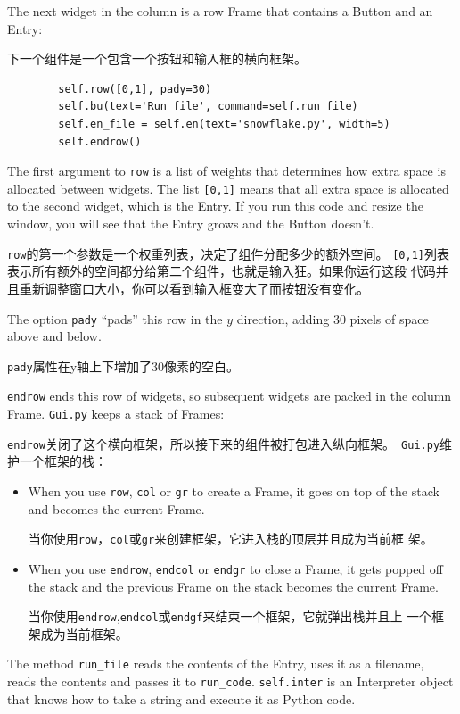 \documentclass[10pt]{book}
\begin{document}
\begin{CJK}{UTF8}{gbsn}
The next widget in the column is a row Frame that contains
a Button and an Entry:

下一个组件是一个包含一个按钮和输入框的横向框架。

\begin{verbatim}
        self.row([0,1], pady=30)
        self.bu(text='Run file', command=self.run_file)
        self.en_file = self.en(text='snowflake.py', width=5)
        self.endrow()
\end{verbatim}
%
The first argument to {\tt row} is a list of weights that
determines how extra space is allocated between widgets.  
The list {\tt [0,1]} means that all extra space is allocated
to the second widget, which is the Entry.  If you run this code
and resize the window, you will see that the Entry grows and
the Button doesn't.

{\tt row}的第一个参数是一个权重列表，决定了组件分配多少的额外空间。
{\tt [0,1]}列表表示所有额外的空间都分给第二个组件，也就是输入狂。如果你运行这段
代码并且重新调整窗口大小，你可以看到输入框变大了而按钮没有变化。

The option {\tt pady} ``pads'' this row in the $y$ direction,
adding 30 pixels of space above and below.

{\tt pady}属性在y轴上下增加了30像素的空白。

{\tt endrow} ends this row of widgets, so subsequent widgets are
packed in the column Frame.  {\tt Gui.py} keeps a stack of Frames:

{\tt endrow}关闭了这个横向框架，所以接下来的组件被打包进入纵向框架。{\tt
Gui.py}维护一个框架的栈：

\begin{itemize}

\item When you use {\tt row}, {\tt col} or {\tt gr} to create a Frame,
it goes on top of the stack and becomes the current Frame.

当你使用{\tt row}，{\tt col}或{\tt gr}来创建框架，它进入栈的顶层并且成为当前框
架。

\item When you use {\tt endrow}, {\tt endcol} or {\tt endgr} to close
a Frame, it gets popped off the stack and the previous Frame on the
stack becomes the current Frame.

当你使用{\tt endrow},{\tt endcol}或{\tt endgf}来结束一个框架，它就弹出栈并且上
一个框架成为当前框架。

\end{itemize} 

The method \verb"run_file" reads the contents of the Entry,
uses it as a filename, reads the contents
and passes it to \verb"run_code".  {\tt self.inter} is an
Interpreter object that knows how to take a string and
execute it as Python code.


\end{CJK}
\end{document}
